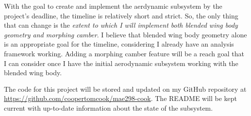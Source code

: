 \documentclass[conf]{new-aiaa}
\begin{document}
With the goal to create and implement the aerdynamic subsystem by the project's deadline, the timeline is relatively short and strict. So, the only thing that can change is the \emph{extent to which I will implement both blended wing body geometry and morphing camber}. I believe that blended wing body geometry alone is an appropriate goal for the timeline, considering I already have an analysis framework working. Adding a morphing camber feature will be a reach goal that I can consider once I have the initial aerodynamic subsystem working with the blended wing body.

The code for this project will be stored and updated on my GitHub repository at \url{
https://github.com/coopertomcook/mae298-cook}. The README will be kept current with up-to-date information about the state of the subsystem.


\end{document}
